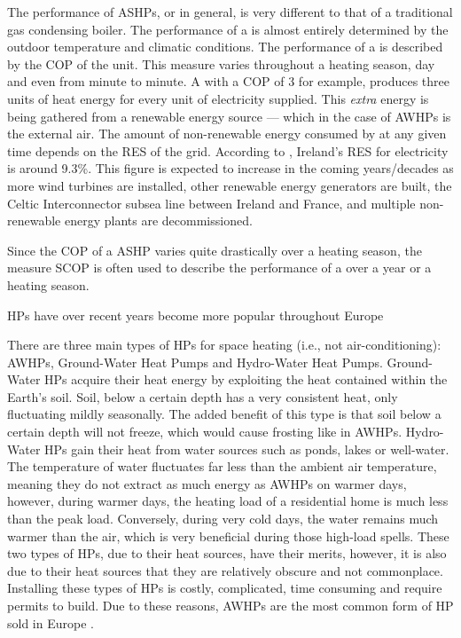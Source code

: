 The performance of \acp{ASHP}, or \HPs in general, is very different to that of a traditional gas condensing boiler. The performance of a \HP is almost entirely determined by the outdoor temperature and climatic conditions. The performance of a \HP is described by the \ac{COP} of the unit. This measure varies throughout a heating season, day and even from minute to minute. A \HP with a \ac{COP} of 3 for example, produces three units of heat energy for every unit of electricity supplied. This \textit{extra} energy is being gathered from a renewable energy source --- which in the case of \acp{AWHP} is the external air. The amount of non-renewable energy consumed by \HP at any given time depends on the \ac{RES} of the grid. According to \citeauthor{seai_2020}, Ireland's \ac{RES} for electricity is around 9.3\%. This figure is expected to increase in the coming years/decades as more wind turbines are installed, other renewable energy generators are built, the Celtic Interconnector subsea line between Ireland and France, and multiple non-renewable energy plants are decommissioned.

Since the \ac{COP} of a \ac{ASHP} varies quite drastically over a heating season, the measure \ac{SCOP} is often used to describe the performance of a \HP over a year or a heating season. 




\acp{HP} have over recent years become more popular throughout Europe 

There are three main types of \acp{HP} for space heating (i.e., not air-conditioning): \acp{AWHP}, Ground-Water Heat Pumps and Hydro-Water Heat Pumps. Ground-Water \acp{HP} acquire their heat energy by exploiting the heat contained within the Earth's soil. Soil, below a certain depth has a very consistent heat, only fluctuating mildly seasonally. The added benefit of this type is that soil below a certain depth will not freeze, which would cause frosting like in \acp{AWHP}. Hydro-Water \acp{HP} gain their heat from water sources such as ponds, lakes or well-water. The temperature of water fluctuates far less than the ambient air temperature, meaning they do not extract as much energy as \acp{AWHP} on warmer days, however, during warmer days, the heating load of a residential home is much less than the peak load. Conversely, during very cold days, the water remains much warmer than the air, which is very beneficial during those high-load spells. These two types of \acp{HP}, due to their heat sources, have their merits, however, it is also due to their heat sources that they are relatively obscure and not commonplace. Installing these types of \acp{HP} is costly, complicated, time consuming and require permits to build. Due to these reasons, \acp{AWHP} are the most common form of \ac{HP} sold in Europe \cite{ehpa_2015}.  

